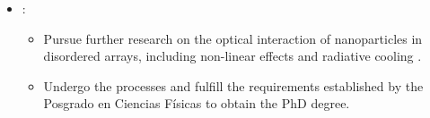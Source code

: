 \begin{itemize}
\begin{itemize}
			\item{} Begin the writing process of my PhD dissertation based on metasurfaces under realistic conditions.
		\end{itemize}	 
	\item {}:
			\begin{itemize}
		\item Pursue further research on the optical interaction of nanoparticles in disordered arrays, including non-linear effects \cite{krasnok_nonlinear_2018} and radiative cooling \cite{chen_investigating_2021}.
		\item Undergo the processes and fulfill the requirements established by the Posgrado en Ciencias Físicas to obtain the PhD degree.
	\end{itemize}	 
			
\end{itemize}